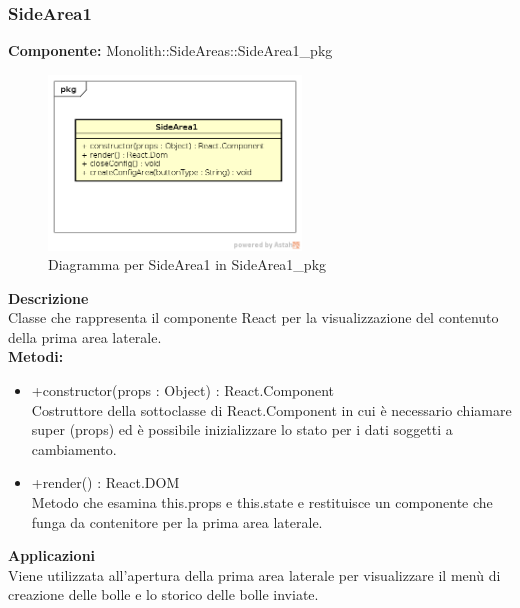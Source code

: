 \clearpage

\subsubsection{SideArea1}
\textbf{Componente:}  Monolith::SideAreas::SideArea1\_pkg\\
   \FloatBarrier
   \begin{figure}[ht]
   \centering
   \includegraphics[width=0.6\textwidth]{img/single-SideArea1}
   \caption{{Diagramma per SideArea1 in SideArea1\_pkg}}
\end{figure}
\FloatBarrier
\textbf{Descrizione}\\
Classe che rappresenta il componente React per la visualizzazione del contenuto della prima area laterale. \\ 
\textbf{Metodi:}
\begin{itemize}

\item +constructor(props : Object) : React.Component 
\\
Costruttore della sottoclasse di React.Component in cui è necessario chiamare super (props) ed è possibile inizializzare lo stato per i dati soggetti a cambiamento.

\item +render() : React.DOM 
\\
Metodo che esamina this.props e this.state e restituisce un componente che funga da contenitore per la prima area laterale.

\end{itemize} 


\textbf{Applicazioni}\\
Viene utilizzata all'apertura della prima area laterale per visualizzare il menù di creazione delle bolle e lo storico delle bolle inviate. 


\clearpage

